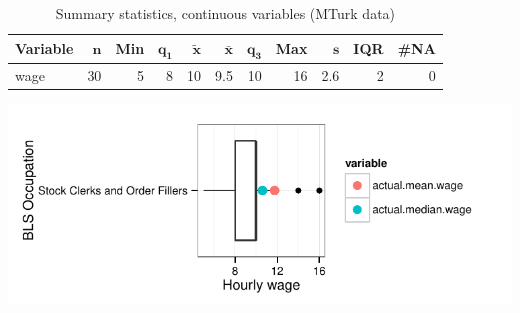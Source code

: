 \documentclass[a4paper,10pt]{article}\usepackage[]{graphicx}\usepackage[]{color}
\makeatletter
\def\maxwidth{ %
  \ifdim\Gin@nat@width>\linewidth
    \linewidth
  \else
    \Gin@nat@width
  \fi
}
\makeatother
\begin{document}
\begin{table}[ht]
\centering
{\footnotesize
\begin{tabular}{lrrrrrrrrrr}
 \textbf{Variable} & $\mathbf{n}$ & \textbf{Min} & $\mathbf{q_1}$ & $\mathbf{\widetilde{x}}$ & $\mathbf{\bar{x}}$ & $\mathbf{q_3}$ & \textbf{Max} & $\mathbf{s}$ & \textbf{IQR} & \textbf{\#NA} \\ 
  \hline
wage & 30 & 5 & 8 & 10 & 9.5 & 10 & 16 & 2.6 & 2 & 0 \\ 
  \end{tabular}
}
\caption{Summary statistics, continuous variables (MTurk data)} 
\label{tab2:43-5080}
\end{table}


{\centering \includegraphics[width=\maxwidth]{figure/unnamed-chunk-216} 

}
\end{document}
